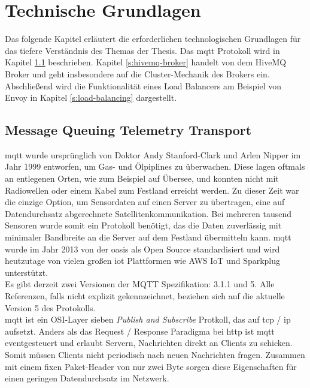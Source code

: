 \section{Technische Grundlagen} \label{s:basics}
Das folgende Kapitel erläutert die erforderlichen technologischen Grundlagen für das tiefere Verständnis des Themas der Thesis.
Das \acs{mqtt} Protokoll wird in Kapitel \ref{s:mqtt} beschrieben.
Kapitel \ref{s:hivemq-broker} handelt von dem HiveMQ Broker und geht insbesondere auf die Cluster-Mechanik des Brokers ein.
Abschlie{\ss}end wird die Funktionalität eines Load Balancers am Beispiel von Envoy in Kapitel \ref{s:load-balancing} dargestellt.

\subsection{Message Queuing Telemetry Transport} \label{s:mqtt}
\acf{mqtt} wurde ursprünglich von Doktor Andy Stanford-Clark und Arlen Nipper im Jahr 1999 entworfen, um Gas- und Ölpiplines zu überwachen. Diese lagen oftmals an entlegenen Orten, wie zum Beispiel auf Übersee, und konnten nicht mit Radiowellen oder einem Kabel zum Festland erreicht werden. Zu dieser Zeit war die einzige Option, um Sensordaten auf einen Server zu übertragen, eine auf Datendurchsatz abgerechnete Satellitenkommunikation. Bei mehreren tausend Sensoren wurde somit ein Protokoll benötigt, das die Daten zuverlässig mit minimaler Bandbreite an die Server auf dem Festland übermitteln kann.
\ac{mqtt} wurde im Jahr 2013 von der \ac{oasis} als Open Source standardisiert und wird heutzutage von vielen gro{\ss}en \ac{iot} Plattformen wie AWS IoT und Sparkplug unterstützt.
\cite{WhatMQTTDefinition}\\
Es gibt derzeit zwei Versionen der MQTT Spezifikation: 3.1.1 und 5. Alle Referenzen, falls nicht explizit gekennzeichnet, beziehen sich auf die aktuelle Version 5 des Protokolls.\\
\ac{mqtt} ist ein OSI-Layer sieben \textit{Publish and Subscribe} Protkoll, das auf \acs{tcp} / \acs{ip} aufsetzt. Anders als das Request / Response Paradigma bei \acs{http} ist \ac{mqtt} eventgesteuert und erlaubt Servern, Nachrichten direkt an Clients zu schicken. Somit müssen Clients nicht periodisch nach neuen Nachrichten fragen. Zusammen mit einem fixen Paket-Header von nur zwei Byte sorgen diese Eigenschaften für einen geringen Datendurchsatz im Netzwerk.\cite{WhatMQTTDefinition}

